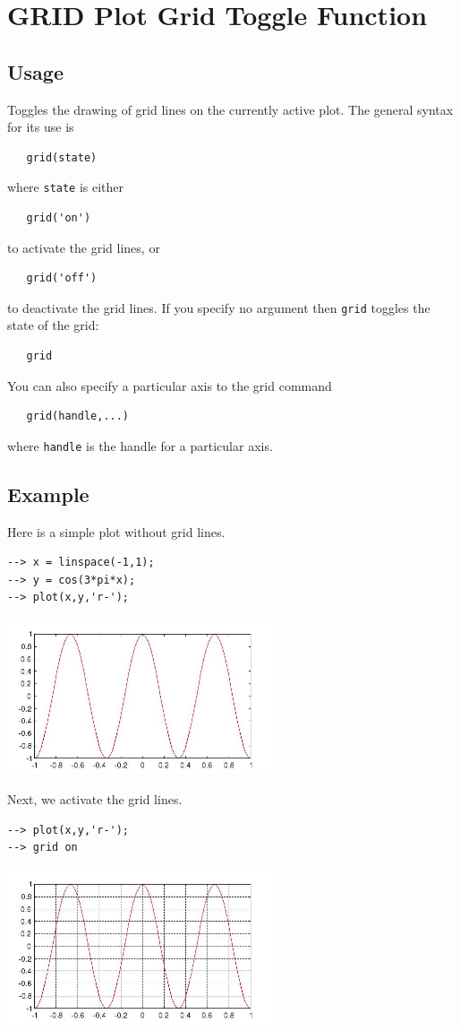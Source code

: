 \section{GRID Plot Grid Toggle Function}

\subsection{Usage}

Toggles the drawing of grid lines on the currently active plot.  The
general syntax for its use is
\begin{verbatim}
   grid(state)
\end{verbatim}
where \verb|state| is either
\begin{verbatim}
   grid('on')
\end{verbatim}
to activate the grid lines, or
\begin{verbatim}
   grid('off')
\end{verbatim}
to deactivate the grid lines.  If you specify no argument then
\verb|grid| toggles the state of the grid:
\begin{verbatim}
   grid
\end{verbatim}
You can also specify a particular axis to the grid command
\begin{verbatim}
   grid(handle,...)
\end{verbatim}
where \verb|handle| is the handle for a particular axis.
\subsection{Example}

Here is a simple plot without grid lines.
\begin{verbatim}
--> x = linspace(-1,1);
--> y = cos(3*pi*x);
--> plot(x,y,'r-');
\end{verbatim}


\centerline{\includegraphics[width=8cm]{grid1}}


Next, we activate the grid lines.
\begin{verbatim}
--> plot(x,y,'r-');
--> grid on
\end{verbatim}


\centerline{\includegraphics[width=8cm]{grid2}}

